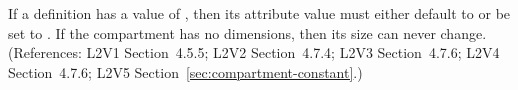 If a \Compartment definition has a  value of
, then its  attribute value must either default to or be
set to .  If the compartment has no dimensions, then its size can
never change.  (References: L2V1 Section~4.5.5; L2V2 Section~4.7.4; L2V3
Section~4.7.6; L2V4 Section~4.7.6; L2V5 Section~\ref{sec:compartment-constant}.)
